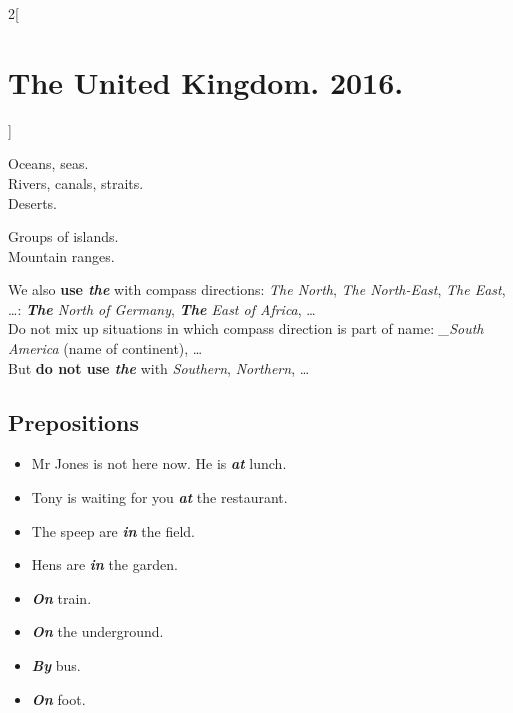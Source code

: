 \documentclass[10pt,a4paper]{article}
\newlength{\OriginalParIndent}
\newcommand\ex[1]{\textit{\textbf{{#1}}}}           %
\newcommand\za{\_\thinspace }                       %
\newenvironment{ItemizeWithOrigParIndent}
    {\begin{itemize}[leftmargin=\OriginalParIndent]}
    {\end{itemize}}
\begin{document}
\begin{multicols}{2}[\section{The United Kingdom. 2016.}]
\hspace{\OriginalParIndent}\begin{minipage}{0.55\linewidth}
Oceans, seas.\\
Rivers, canals, straits.\\
Deserts.
\end{minipage}
\begin{minipage}{0.3\linewidth}
Groups of islands.\\
Mountain ranges.
\end{minipage}\vspace{\parskip}

We also \textbf{use \ex{the}} with compass directions: \textit{The North}, \textit{The North-East}, \textit{The East}, \dots: \textit{\ex{The} North of Germany}, \textit{\ex{The} East of Africa}, \dots\\
Do not mix up situations in which compass direction is part of name:
\textit{\za South America} (name of continent), \dots\\
But \textbf{do not use \ex{the}} with \textit{Southern}, \textit{Northern}, \dots







\subsection{Prepositions}

\begin{ItemizeWithOrigParIndent}
  \item Mr Jones is not here now. He is \ex{at} lunch.
  \item Tony is waiting for you \ex{at} the restaurant.
  \item The speep are \ex{in} the field.
  \item Hens are \ex{in} the garden.
\end{ItemizeWithOrigParIndent}

\begin{ItemizeWithOrigParIndent}
  \item \ex{On} train.
  \item \ex{On} the underground.
  \item \ex{By} bus.
  \item \ex{On} foot.
\end{ItemizeWithOrigParIndent}







\end{multicols}
\end{document}

